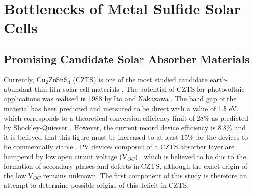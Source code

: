 \chapter{Bottlenecks of Metal Sulfide Solar Cells}

\section{Promising Candidate Solar Absorber Materials}

Currently, Cu$_2$ZnSnS$_4$ (CZTS) is one of the most studied candidate earth-abundant thin-film solar cell materials \cite{CZTS_vs_MAPI}. The potential of CZTS for photovoltaic applications was realised in 1988 by Ito and Nakazawa \cite{first_CZTS}. The band gap of the material has been predicted \cite{CZTS_bandgap_theory} and measured \cite{CZTS_bandgap_exp} to be direct with a value of 1.5 eV, which corresponds to a theoretical conversion efficiency limit of 28\% as predicted by Shockley-Quiesser \cite{SQ_1961}. However, the current record device efficiency is 8.8\% \cite{CZTS_record} and it is believed that this figure must be increased to at least 15\% for the devices to be commercially viable \cite{SS}. PV devices composed of a CZTS absorber layer are hampered by low open circuit voltage (V$_{OC}$) \cite{SS}, which is believed to be due to the formation of secondary phases \cite{CZTS_phases} and defects \cite{CZTS_defects} in CZTS, although the exact origin of the low V$_{OC}$ remains unknown. The first component of this study is therefore an attempt to determine possible origins of this deficit in CZTS.

